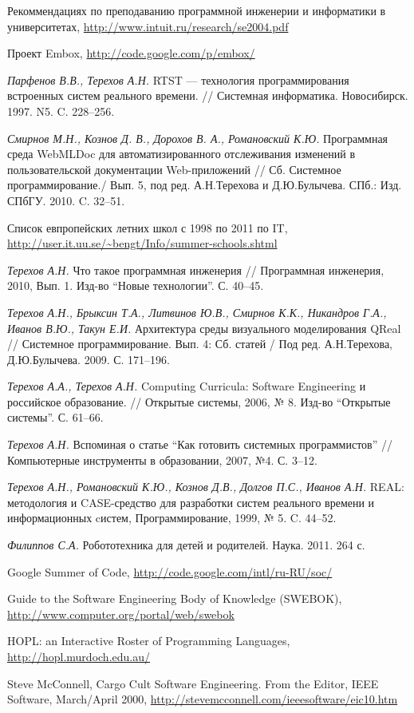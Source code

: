 \documentclass[a4paper]{article}
\begin{document}
\begin{thebibliography}{9001}
   Рекоммендациях по преподаванию программной инженерии и информатики в университетах, \url{http://www.intuit.ru/research/se2004.pdf}  

   Проект Embox, \url{http://code.google.com/p/embox/}

   \emph{Парфенов В.В., Терехов А.Н.} RTST --- технология программирования встроенных систем реального времени. // Системная информатика. Новосибирск. 1997. N5. C. 228--256.
  
  \emph{Смирнов М.Н., Кознов Д. В., Дорохов В. А., Романовский К.Ю.} Программная среда WebMLDoc для автоматизированного отслеживания изменений в пользовательской документации Web-приложений // Сб. Системное программирование./ Вып. 5, под ред. А.Н.Терехова и Д.Ю.Булычева. СПб.: Изд. СПбГУ. 2010. C. 32--51.
  
   Список  евпропейских летних школ с 1998 по 2011 по IT, \url{http://user.it.uu.se/~bengt/Info/summer-schools.shtml}

  \emph{Терехов А.Н.} Что такое программная инженерия // Программная инженерия, 2010, Вып. 1. Изд-во ``Новые технологии''. С. 40--45.

   \emph{Терехов А.Н., Брыксин Т.А., Литвинов Ю.В., Смирнов К.К., Никандров  Г.А., Иванов В.Ю., Такун Е.И.} Архитектура среды визуального  моделирования QReal // Системное программирование. Вып. 4: Сб. статей  / Под ред. А.Н.Терехова, Д.Ю.Булычева. 2009. С. 171--196.

  \emph{Терехов А.А., Терехов А.Н.} Computing Curricula: Software Engineering и российское образование. // Открытые системы, 2006, № 8. Изд-во ``Открытые системы''. С. 61--66.

  \emph{Терехов А.Н.} Вспоминая о статье ``Как готовить системных программистов'' // Компьютерные инструменты в образовании, 2007, №4. С. 3--12.

   \emph{Терехов А.Н., Романовский К.Ю., Кознов Д.В., Долгов П.С., Иванов А.Н.} REAL: методология и CASE-средство для разработки систем реального времени и информационных cистем, Программирование, 1999, № 5. C. 44--52.

   \emph{Филиппов С.А.} Робототехника для детей и родителей. Наука. 2011. 264 с.

   Google Summer of Code, \url{http://code.google.com/intl/ru-RU/soc/}

   Guide to the Software Engineering Body of Knowledge (SWEBOK), \url{http://www.computer.org/portal/web/swebok}
  
   HOPL: an Interactive Roster of Programming Languages,  \url{http://hopl.murdoch.edu.au/}
  
   Steve McConnell, Cargo Cult Software Engineering. From the Editor, IEEE Software, March/April 2000, \url{http://stevemcconnell.com/ieeesoftware/eic10.htm}


\end{thebibliography}
\end{document}
